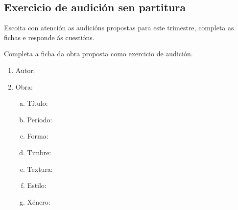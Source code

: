 \subsection*{Exercicio de audición sen partitura}
%
Escoita con atención as audicións propostas para este trimestre, completa as fichas e responde ás cuestións.
%
%
% 
%
\vspace*{0.25cm}

\begin{ejercicio}[] 
%
Completa a ficha da obra proposta como exercicio de audición.
%
\begin{multicols}{2}
	\begin{enumerate}[1.-]
        \vspace*{0.3cm}
		\item
			Autor: \dotfill
			\vspace*{0.3cm}
		\item
			Obra:
			\begin{enumerate}[a)]
			    \item Título: \dotfill \vspace*{0.3cm}
			    \item Período: \dotfill \vspace*{0.3cm}
			    \item Forma: \dotfill \vspace*{0.3cm}
			    \item Timbre: \dotfill 			\vspace*{0.3cm}
			    \item Textura: \dotfill \vspace*{0.3cm}
			    \item Estilo: \dotfill \vspace*{0.3cm}
			    \item Xénero: \dotfill 
			    \vspace*{0.3cm}
			\end{enumerate}
	\end{enumerate}
\end{multicols}
	\begin{itemize}
    
    

\end{itemize}
\end{ejercicio}
